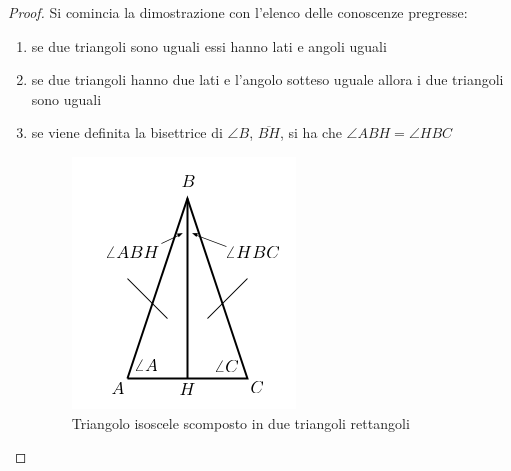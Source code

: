 \documentclass[a4paper]{book}
\begin{document}
\begin{proof}

Si comincia la dimostrazione con l'elenco delle conoscenze pregresse:
\begin{enumerate}
\item se due triangoli sono uguali essi hanno lati e angoli uguali
\item se due triangoli hanno due lati e l'angolo sotteso uguale allora i due triangoli sono uguali
\item se viene definita la bisettrice di $\angle B$, $\overline{BH}$, si ha che $\angle ABH = \angle HBC$
\begin{figure}
\centering
\caption{Triangolo isoscele scomposto in due triangoli rettangoli}
\includegraphics[scale=0.5]{img/tri2.png}
\end{figure}


\end{enumerate}
\end{proof}
\end{document}
